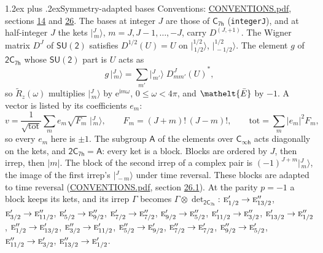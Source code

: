 \documentclass[10pt,a4paper]{article}
\makeatletter
\renewcommand\section{\@startsection{section}{1}{\z@}{-3ex plus -1ex minus -.2ex}%
  {1.2ex plus .2ex}{\normalfont\large\sffamily\bfseries\color{parttitle}}}
\numberwithin{equation}{section}
\newcommand{\eltfont}[1]{{\let\sigma\eltsigma\mathelt{#1}}}
\newcommand{\grp}[1]{\mathsf{#1}}
\newcommand{\irr}[1]{\text{\normalfont\scshape #1}}
\newcommand{\elt}[1]{\eltfont{#1}}
\newcommand{\iunit}{\mathrm{i}}
\newcommand{\expe}{\mathrm{e}}
\newcommand{\irrJp}[2]{D^{(#1,#2)}}
\newcommand{\wignerD}[1]{D^{#1}}
\newcommand{\conj}[1]{{#1}^{*}}
\newcommand{\irrprod}{\otimes}
\newcommand{\jm}[2]{\bigl\lvert{}^{#1}_{\,#2}\bigr\rangle}
\newcommand{\barred}[1]{\bar{#1}}
\newcommand{\lift}[1]{\tilde{#1}}
\makeatother
\begin{document}
\section{Symmetry-adapted bases}\label{s:bases}
Conventions: \href{../../CONVENTIONS.pdf}{CONVENTIONS.pdf}, sections \href{../../../rotation/CONVENTIONS.pdf\#conv.14}{14} and \href{../../CONVENTIONS.pdf\#conv.26}{26}.
\leavevmode\label{n:index.m}\label{n:vector.ket}The bases at integer $J$ are those of \href{../../../rotation/data/pdf/C7h.pdf}{$\grp{C_{7h}}$} (\texttt{integerJ}), and at half-integer $J$ the kets $\jm{J}{m}$, $m = J, J-1, \dots, -J$, carry $\irrJp{J}{+1}$. \label{n:matrix.wigner}The Wigner matrix $\wignerD{J}$ of $\grp{SU(2)}$ satisfies $\wignerD{1/2}(U) = U$ on $\jm{1/2}{1/2}$, $\jm{1/2}{-1/2}$. The element $g$ of $\grp{2C_{7h}}$ whose $\grp{SU(2)}$ part is $U$ acts as
\begin{equation}\label{e:action}g\,\jm{J}{m} = \sum_{m'} \jm{J}{m'}\; \conj{\wignerD{J}_{m m'}(U)},\end{equation}
so $\lift{R}_{z}(\omega)$ multiplies $\jm{J}{m}$ by $\expe^{\iunit m\omega}$, $0 \le \omega < 4\pi$, and $\elt{\barred{E}}$ by $-1$. \label{n:index.ketcoefficient}\label{n:vector.basis.symmetry}\label{n:index.ketweight}\label{n:index.total}A vector is listed by its coefficients $e_m$:
\begin{equation}\label{e:ket}v = \frac{1}{\sqrt{\mathrm{tot}}}\sum_m e_m\sqrt{F_m}\;\jm{J}{m},\qquad F_m = (J+m)!\,(J-m)!,\qquad \mathrm{tot} = \sum_m |e_m|^2F_m,\end{equation}
so every $e_m$ here is $\pm 1$.
\leavevmode\label{n:group.A}The subgroup $\grp{A}$ of the elements over $\grp{C_{\infty h}}$ acts diagonally on the kets, and $\grp{2C_{7h}} = \grp{A}$: every ket is a block. Blocks are ordered by $J$, then irrep, then $|m|$. The block of the second irrep of a complex pair is $(-1)^{J+m}\jm{J}{m}$, the image of the first irrep's $\jm{J}{-m}$ under time reversal. These blocks are adapted to time reversal (\href{../../CONVENTIONS.pdf}{CONVENTIONS.pdf}, section \href{../../CONVENTIONS.pdf\#conv.26.1}{26.1}).
At the parity $p = -1$ a block keeps its kets, and its irrep $\Gamma$ becomes $\Gamma \irrprod \det_{\grp{2C_{7h}}}$: $\irr{e}_{1/2}' \to \irr{e}_{13/2}''$, $\irr{e}_{3/2}' \to \irr{e}_{11/2}''$, $\irr{e}_{5/2}' \to \irr{e}_{9/2}''$, $\irr{e}_{7/2}' \to \irr{e}_{7/2}''$, $\irr{e}_{9/2}' \to \irr{e}_{5/2}''$, $\irr{e}_{11/2}' \to \irr{e}_{3/2}''$, $\irr{e}_{13/2}' \to \irr{e}_{1/2}''$, $\irr{e}_{1/2}'' \to \irr{e}_{13/2}'$, $\irr{e}_{3/2}'' \to \irr{e}_{11/2}'$, $\irr{e}_{5/2}'' \to \irr{e}_{9/2}'$, $\irr{e}_{7/2}'' \to \irr{e}_{7/2}'$, $\irr{e}_{9/2}'' \to \irr{e}_{5/2}'$, $\irr{e}_{11/2}'' \to \irr{e}_{3/2}'$, $\irr{e}_{13/2}'' \to \irr{e}_{1/2}'$.
\end{document}
